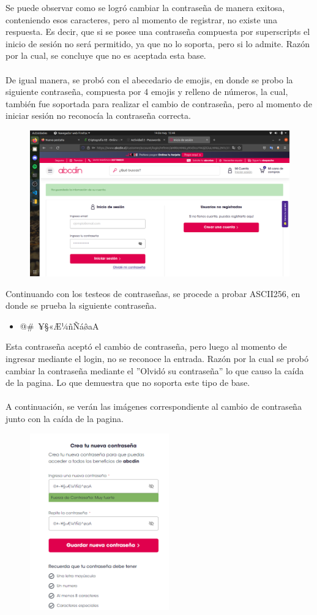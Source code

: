\documentclass{article}
\begin{document}
Se puede observar como se logró cambiar la contraseña de manera exitosa, conteniendo esos caracteres, pero al momento de registrar, no existe una respuesta. Es decir, que
si se posee una contraseña compuesta por superscripts el inicio de sesión no será permitido, ya que no lo soporta, pero si lo admite. Razón por la cual, se concluye que no
es aceptada esta base.
\\\\
De igual manera, se probó con el abecedario de emojis, en donde se probo la siguiente contraseña, compuesta por 4 emojis y relleno de números, la cual, también fue soportada para realizar el cambio de contraseña, pero al momento de iniciar sesión no reconocía la contraseña correcta. 
\begin{figure}[h]
    \centering
    \includegraphics[width=15cm]{emojiscl.png}
\end{figure}
Continuando con los testeos de contraseñas, se procede a probar ASCII256, en donde se prueba la siguiente contraseña. 
\begin{itemize}
    \item @#~¥§«Æ¼ñÑá\^øaA
\end{itemize}
Esta contraseña aceptó el cambio de contraseña, pero luego al momento de ingresar mediante el login, no se reconoce la entrada. Razón por la cual se probó cambiar la contraseña mediante el ''Olvidó su contraseña'' lo que causo la caída de la pagina. Lo que demuestra que no soporta este tipo de base. 
\\\\
A continuación, se verán las imágenes correspondiente al cambio de contraseña junto con la caída de la pagina. 
\begin{figure}[h]
    \centering
    \includegraphics[width=6cm]{asci256.PNG}
\end{figure}
\end{document}
